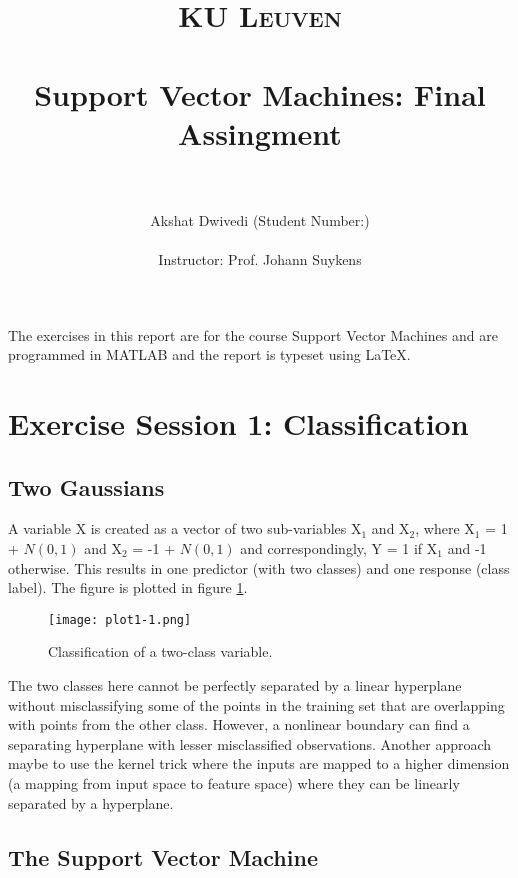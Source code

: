 \documentclass[paper=a4, fontsize=11pt]{scrartcl} %
\title{	
\normalfont \normalsize 
\textsc{\Large KU Leuven} \\ [30pt] %
\horrule{0.5pt} \\[0.4cm] %
\huge Support Vector Machines: Final Assingment \\ %
\horrule{2pt} \\[0.5cm] %
}
\author{Akshat Dwivedi (Student Number:)\\
\\
Instructor: Prof. Johann Suykens} %
\numberwithin{equation}{section} %
\begin{document}
\maketitle %

\thispagestyle{empty}
\clearpage

\tableofcontents
\thispagestyle{empty}
\clearpage
\setcounter{page}{1}



The exercises in this report are for the course Support Vector Machines and are programmed in MATLAB and the report is typeset using \LaTeX.

\section{Exercise Session 1: Classification}

\subsection{Two Gaussians}

A variable X is created as a vector of two sub-variables X$_1$ and X$_2$, where X$_1$ = 1 + $N(0,1)$ and X$_2$ = -1 + $N(0,1)$ and correspondingly, Y = 1 if X$_1$ and -1 otherwise. This results in one predictor (with two classes) and one response (class label). The figure is plotted in figure \ref{1-1}.

\begin{figure}[ht]
\centering
\texttt{[image: plot1-1.png]}
\caption{Classification of a two-class variable.}
\label{1-1}
\end{figure}

The two classes here cannot be perfectly separated by a linear hyperplane without misclassifying some of the points in the training set that are overlapping with points from the other class. However, a nonlinear boundary can find a separating hyperplane with lesser misclassified observations. Another approach maybe to use the kernel trick where the inputs are mapped to a higher dimension (a mapping from input space to feature space) where they can be linearly separated by a hyperplane.

\subsection{The Support Vector Machine}
\end{document}
